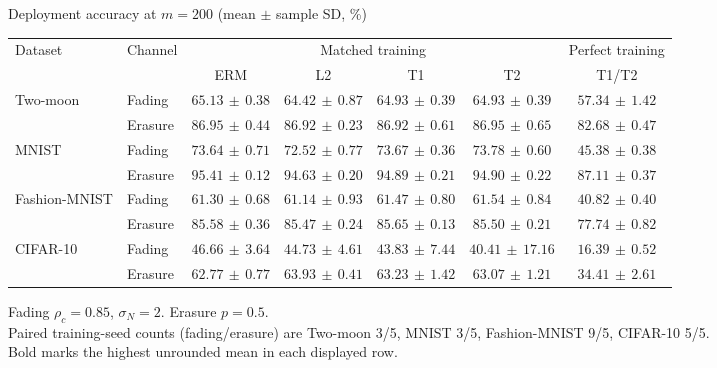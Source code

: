 \documentclass[border=4pt]{standalone}
\begin{document}
\begin{minipage}{7.8in}
\centering
Deployment accuracy at $m=200$ (mean $\pm$ sample SD, \%)\\[4pt]
\begin{tabular*}{\linewidth}{@{\extracolsep{\fill}}llccccc@{}}
\toprule
\multirow{2}{*}{Dataset} & \multirow{2}{*}{Channel} & \multicolumn{4}{c}{Matched training} & Perfect training \\
\cmidrule(lr){3-6}\cmidrule(l){7-7}
 & & ERM & L2 & T1 & T2 & T1/T2 \\
\midrule
\multirow{2}{*}{Two-moon} & Fading & $\mathbf{65.13}\,\pm\,0.38$ & $64.42\,\pm\,0.87$ & $64.93\,\pm\,0.39$ & $64.93\,\pm\,0.39$ & $57.34\,\pm\,1.42$ \\
 & Erasure & $86.95\,\pm\,0.44$ & $86.92\,\pm\,0.23$ & $86.92\,\pm\,0.61$ & $\mathbf{86.95}\,\pm\,0.65$ & $82.68\,\pm\,0.47$ \\
\midrule[0.25pt]
\multirow{2}{*}{MNIST} & Fading & $73.64\,\pm\,0.71$ & $72.52\,\pm\,0.77$ & $73.67\,\pm\,0.36$ & $\mathbf{73.78}\,\pm\,0.60$ & $45.38\,\pm\,0.38$ \\
 & Erasure & $\mathbf{95.41}\,\pm\,0.12$ & $94.63\,\pm\,0.20$ & $94.89\,\pm\,0.21$ & $94.90\,\pm\,0.22$ & $87.11\,\pm\,0.37$ \\
\midrule[0.25pt]
\multirow{2}{*}{Fashion-MNIST} & Fading & $61.30\,\pm\,0.68$ & $61.14\,\pm\,0.93$ & $61.47\,\pm\,0.80$ & $\mathbf{61.54}\,\pm\,0.84$ & $40.82\,\pm\,0.40$ \\
 & Erasure & $85.58\,\pm\,0.36$ & $85.47\,\pm\,0.24$ & $\mathbf{85.65}\,\pm\,0.13$ & $85.50\,\pm\,0.21$ & $77.74\,\pm\,0.82$ \\
\midrule[0.25pt]
\multirow{2}{*}{CIFAR-10} & Fading & $\mathbf{46.66}\,\pm\,3.64$ & $44.73\,\pm\,4.61$ & $43.83\,\pm\,7.44$ & $40.41\,\pm\,17.16$ & $16.39\,\pm\,0.52$ \\
 & Erasure & $62.77\,\pm\,0.77$ & $\mathbf{63.93}\,\pm\,0.41$ & $63.23\,\pm\,1.42$ & $63.07\,\pm\,1.21$ & $34.41\,\pm\,2.61$ \\
\bottomrule
\end{tabular*}
\par\smallskip\raggedright\footnotesize
Fading $\rho_c=0.85$, $\sigma_N=2$. Erasure $p=0.5$.\\
Paired training-seed counts (fading/erasure) are Two-moon 3/5, MNIST 3/5, Fashion-MNIST 9/5, CIFAR-10 5/5.\\
Bold marks the highest unrounded mean in each displayed row.
\end{minipage}
\end{document}
